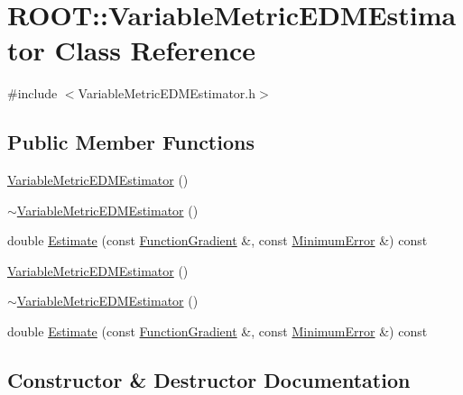 \hypertarget{classROOT_1_1Minuit2_1_1VariableMetricEDMEstimator}{}\section{R\+O\+OT\+:\+:Variable\+Metric\+E\+D\+M\+Estimator Class Reference}
\label{classROOT_1_1Minuit2_1_1VariableMetricEDMEstimator}


{\ttfamily \#include $<$Variable\+Metric\+E\+D\+M\+Estimator.\+h$>$}

\subsection*{Public Member Functions}
\begin{DoxyCompactItemize}
\item 
\mbox{\hyperlink{classROOT_1_1Minuit2_1_1VariableMetricEDMEstimator_a4de1c62c58e9d452ae2b6fbdc02e01f0}{Variable\+Metric\+E\+D\+M\+Estimator}} ()
\item 
\mbox{\hyperlink{classROOT_1_1Minuit2_1_1VariableMetricEDMEstimator_a941bd6273d8a7bf2078dc79122346f87}{$\sim$\+Variable\+Metric\+E\+D\+M\+Estimator}} ()
\item 
double \mbox{\hyperlink{classROOT_1_1Minuit2_1_1VariableMetricEDMEstimator_a3c4d22f40ab9ea39de88cca47ddfcb5f}{Estimate}} (const \mbox{\hyperlink{classROOT_1_1Minuit2_1_1FunctionGradient}{Function\+Gradient}} \&, const \mbox{\hyperlink{classROOT_1_1Minuit2_1_1MinimumError}{Minimum\+Error}} \&) const
\item 
\mbox{\hyperlink{classROOT_1_1Minuit2_1_1VariableMetricEDMEstimator_a4de1c62c58e9d452ae2b6fbdc02e01f0}{Variable\+Metric\+E\+D\+M\+Estimator}} ()
\item 
\mbox{\hyperlink{classROOT_1_1Minuit2_1_1VariableMetricEDMEstimator_a941bd6273d8a7bf2078dc79122346f87}{$\sim$\+Variable\+Metric\+E\+D\+M\+Estimator}} ()
\item 
double \mbox{\hyperlink{classROOT_1_1Minuit2_1_1VariableMetricEDMEstimator_a3c4d22f40ab9ea39de88cca47ddfcb5f}{Estimate}} (const \mbox{\hyperlink{classROOT_1_1Minuit2_1_1FunctionGradient}{Function\+Gradient}} \&, const \mbox{\hyperlink{classROOT_1_1Minuit2_1_1MinimumError}{Minimum\+Error}} \&) const
\end{DoxyCompactItemize}


\subsection{Constructor \& Destructor Documentation}
\mbox{\label{classROOT_1_1Minuit2_1_1VariableMetricEDMEstimator_a4de1c62c58e9d452ae2b6fbdc02e01f0}} 
